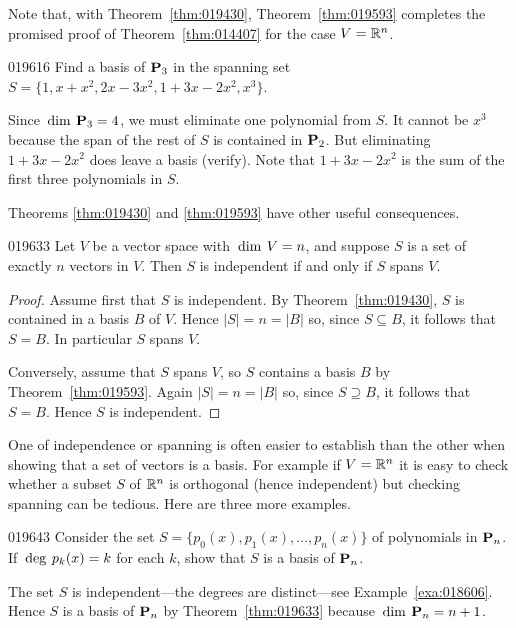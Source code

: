 \noindent Note that, with Theorem~\ref{thm:019430}, Theorem~\ref{thm:019593} completes the promised proof of Theorem~\ref{thm:014407} for the case $V = \mathbb{R}^n$.

\begin{example}{}{019616}
Find a basis of $\textbf{P}_{3}$ in the spanning set $S = \{1, x + x^{2}, 2x - 3x^{2}, 1 + 3x - 2x^{2}, x^{3}\}$.

\begin{solution}
Since $\thinspace\operatorname{dim\medspace} \textbf{P}_{3} = 4$, we must eliminate one polynomial from $S$. It cannot be $x^{3}$ because the span of the rest of $S$ is contained in $\textbf{P}_{2}$. But eliminating $1 + 3x - 2x^{2}$ does leave a basis (verify). Note that $1 + 3x - 2x^{2}$ is the sum of the first three polynomials in $S$.
\end{solution}
\end{example}

\noindent Theorems \ref{thm:019430} and \ref{thm:019593} have other useful consequences.

\begin{theorem}{}{019633}
Let $V$ be a vector space with $\thinspace\operatorname{dim\medspace} V = n$, and suppose $S$ is a set of exactly $n$ vectors in $V$. Then $S$ is independent if and only if $S$ spans $V$.
\end{theorem}

\begin{proof}
Assume first that $S$ is independent. By Theorem~\ref{thm:019430}, $S$ is contained in a basis $B$ of $V$. Hence $|S| = n = |B|$ so, since $S \subseteq B$, it follows that $S = B$. In particular $S$ spans $V$.

Conversely, assume that $S$ spans $V$, so $S$ contains a basis $B$ by Theorem~\ref{thm:019593}. Again $|S| = n = |B|$ so, since $S \supseteq B$, it follows that $S = B$. Hence $S$ is independent.
\end{proof}

\noindent One of independence or spanning is often easier to establish than the other when showing that a set of vectors is a basis. For example if $V = \mathbb{R}^n$ it is easy to check whether a subset $S$ of $\mathbb{R}^n$ is orthogonal (hence independent) but checking spanning can be tedious. Here are three more examples.

\begin{example}{}{019643}
Consider the set $S = \{p_{0}(x), p_{1}(x), \dots, p_{n}(x)\}$ of polynomials in $\textbf{P}_{n}$. If $\thinspace\operatorname{deg\medspace} p_{k}(x) = k$ for each $k$, show that $S$ is a basis of $\textbf{P}_{n}$.

\begin{solution}
The set $S$ is independent---the degrees are distinct---see Example~\ref{exa:018606}. Hence $S$ is a basis of $\textbf{P}_{n}$ by Theorem~\ref{thm:019633} because $\thinspace\operatorname{dim\medspace} \textbf{P}_{n} = n + 1$.
\end{solution}
\end{example}

